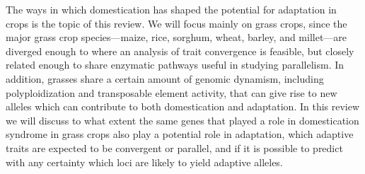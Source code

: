 \documentclass[12pt]{article}
\begin{document}
The ways in which domestication has shaped the potential for adaptation in crops is the topic of this review. We will focus mainly on grass crops, since the major grass crop species—maize, rice, sorghum, wheat, barley, and millet—are diverged enough to where an analysis of trait convergence is feasible, but closely related enough to share enzymatic pathways useful in studying parallelism. In addition, grasses share a certain amount of genomic dynamism, including polyploidization and transposable element activity, that can give rise to new alleles which can contribute to both domestication and adaptation.  In this review we will discuss to what extent the same genes that played a role in domestication syndrome in grass crops also play a potential role in adaptation, which adaptive traits are expected to be convergent or parallel, and if it is possible to predict with any certainty which loci are likely to yield adaptive alleles. 
\paragraph{}
\end{document}
